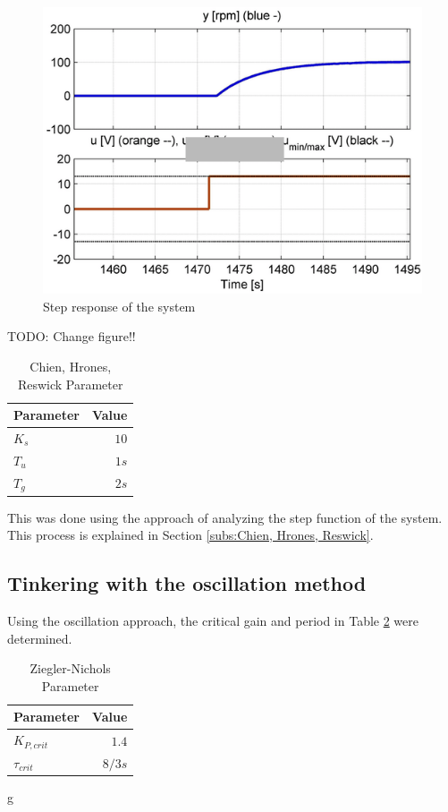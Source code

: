 \begin{figure}[H]
\begin{center}
\includegraphics[width=0.6\linewidth]{images/general/Step_Response}
\end{center}
\caption{Step response of the system}
\label{fig:step_response}
\end{figure}
TODO: Change figure!!

\begin{table}[H]
\begin{center}
\begin{tabular}{ l | r}
  Parameter & Value\\
  \hline
  \hline
  $K_s$ & $10$\\
  \hline
  $T_u$ & $1s$\\
  \hline
  $T_g$ & $2s$\\
  \hline
\end{tabular}
\end{center}
\caption{Chien, Hrones, Reswick Parameter}
\label{tab:step_params}
\end{table}

This was done using the approach of analyzing the step function of the system. This process is explained in Section \ref{subs:Chien, Hrones, Reswick}.

\subsection{Tinkering with the oscillation method}

Using the oscillation approach, the critical gain and period in Table \ref{tab:osc_params} were determined.

\begin{table}[H]
\begin{center}
\begin{tabular}{ l | r}
  Parameter & Value\\
  \hline
  \hline
  $K_{P,crit}$ & $1.4$\\
  \hline
  $\tau_{crit}$ & $8/3s$\\
  \hline
\end{tabular}g
\end{center}
\caption{Ziegler-Nichols Parameter}
\label{tab:osc_params}
\end{table}

